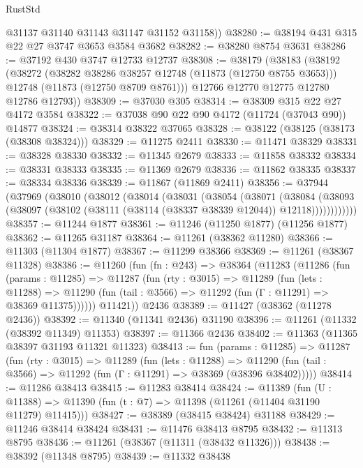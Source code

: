 \begin{lexlean}{RustStd}
\begin{coremodule}
        @31137
        @31140
        @31143
        @31147
        @31152
        @31158))
@38280 := @38194 @431 @315 @22 @27 @3747 @3653 @3584 @3682
@38282 := @38280 @8754 @3631
@38286 := @37192 @430 @3747 @12733 @12737
@38308 := @38179
    (@38183
      (@38192
        (@38272
          (@38282 @38286 @38257 @12748 (@11873 (@12750 @8755 @3653)))
          @12748
          (@11873 (@12750 @8709 @8761)))
        @12766
        @12770
        @12775
        @12780
        @12786
        @12793))
@38309 := @37030 @305
@38314 := @38309 @315 @22 @27 @4172 @3584
@38322 := @37038 @90 @22 @90 @4172 (@11724 (@37043 @90)) @14877
@38324 := @38314 @38322 @37065
@38328 := @38122 (@38125 (@38173 (@38308 @38324)))
@38329 := @11275 @2411
@38330 := @11471 @38329
@38331 := @38328 @38330
@38332 := @11345 @2679
@38333 := @11858 @38332
@38334 := @38331 @38333
@38335 := @11369 @2679
@38336 := @11862 @38335
@38337 := @38334 @38336
@38339 := @11867 (@11869 @2411)
@38356 := @37944
    (@37969
      (@38010
        (@38012
          (@38014
            (@38031
              (@38054
                (@38071
                  (@38084
                    (@38093
                      (@38097 (@38102 (@38111 (@38114 (@38337 @38339 @12044)) @12118))))))))))))
@38357 := @11244 @1877
@38361 := @11246 (@11250 @1877) (@11256 @1877)
@38362 := @11265 @31187
@38364 := @11261 (@38362 @11280)
@38366 := @11303 (@11304 @1877)
@38367 := @11299 @38366
@38369 := @11261 (@38367 @11328)
@38386 := @11260
    (fun (fn : @243) =>
    @38364
      (@11283
        (@11286
          (fun (params : @11285) =>
          @11287
            (fun (rty : @3015) =>
            @11289
              (fun (lets : @11288) =>
              @11290 (fun (tail : @3566) => @11292 (fun (Γ : @11291) => @38369 @11375))))))
        @11421))
    @2436
@38389 := @11427 (@38362 (@11278 @2436))
@38392 := @11340 (@11341 @2436) @31190
@38396 := @11261 (@11332 (@38392 @11349) @11353)
@38397 := @11366 @2436
@38402 := @11363 (@11365 @38397 @31193 @11321 @11323)
@38413 := fun (params : @11285) =>
  @11287
    (fun (rty : @3015) =>
    @11289
      (fun (lets : @11288) =>
      @11290 (fun (tail : @3566) => @11292 (fun (Γ : @11291) => @38369 (@38396 @38402)))))
@38414 := @11286 @38413
@38415 := @11283 @38414
@38424 := @11389
    (fun (U : @11388) => @11390 (fun (t : @7) => @11398 (@11261 (@11404 @31190 @11279) @11415)))
@38427 := @38389 (@38415 @38424) @31188
@38429 := @11246 @38414 @38424
@38431 := @11476 @38413 @8795
@38432 := @11313 @8795
@38436 := @11261 (@38367 (@11311 (@38432 @11326)))
@38438 := @38392 (@11348 @8795)
@38439 := @11332 @38438

\end{coremodule}
\end{lexlean}
